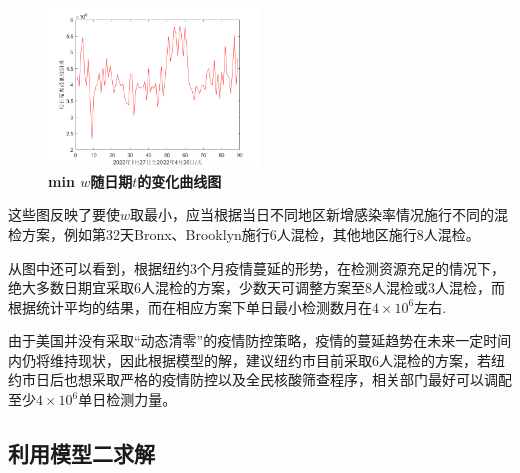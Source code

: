 \documentclass[withoutpreface,bwprint]{cumcmthesis} %
\begin{document}
\begin{figure}[H]
\centering
\includegraphics[width=0.5\textwidth]{fig_pro22.png}
\caption{\textbf{\rm{min} $w$随日期$t$的变化曲线图}}
\label{pro1}
\end{figure}

这些图反映了要使$w$取最小，应当根据当日不同地区新增感染率情况施行不同的混检方案，例如第32天Bronx、Brooklyn施行6人混检，其他地区施行8人混检。

从图中还可以看到，根据纽约3个月疫情蔓延的形势，在检测资源充足的情况下，绝大多数日期宜采取6人混检的方案，少数天可调整方案至8人混检或3人混检，而根据统计平均的结果，而在相应方案下单日最小检测数月在$4 \times 10^6$左右.

由于美国并没有采取“动态清零”的疫情防控策略，疫情的蔓延趋势在未来一定时间内仍将维持现状，因此根据模型的解，建议纽约市目前采取6人混检的方案，若纽约市日后也想采取严格的疫情防控以及全民核酸筛查程序，相关部门最好可以调配至少$4 \times 10^6$单日检测力量。

\subsection{利用模型二求解}
\end{document}
